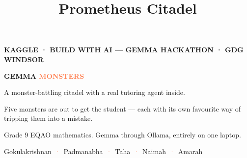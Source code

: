 \documentclass[aspectratio=169,11pt]{beamer}
\title{Prometheus Citadel}
\author{}
\date{}
\newcommand{\kicker}[1]{{\color{coral}\scriptsize\bfseries\MakeUppercase{#1}}\\[0.3em]}
\newcommand{\dimt}[1]{{\color{cream!62!gmbg}#1}}
\begin{document}
\begin{frame}
  \begin{center}
    \vspace{1.1em}
    \kicker{Kaggle · Build with AI --- Gemma Hackathon · GDG Windsor}
    {\fontsize{40}{44}\selectfont\bfseries\color{cream} GEMMA \textcolor{coral}{MONSTERS}\par}
    \vspace{0.55em}
    {\Large A monster-battling citadel with a real tutoring agent inside.\par}
    \vspace{0.55em}
    {\color{gold}\large Five monsters are out to get the student --- each with its own
     favourite way of tripping them into a mistake.\par}
    \vspace{0.35em}
    \dimt{Grade 9 EQAO mathematics. Gemma through Ollama, entirely on one laptop.}\par
    \vspace{1.4em}
    {\small Gokulakrishnan \,\textcolor{coral}{·}\, Padmanabha \,\textcolor{coral}{·}\, Taha \,\textcolor{coral}{·}\, Naimah \,\textcolor{coral}{·}\, Amarah}
  \end{center}
\end{frame}
\end{document}
